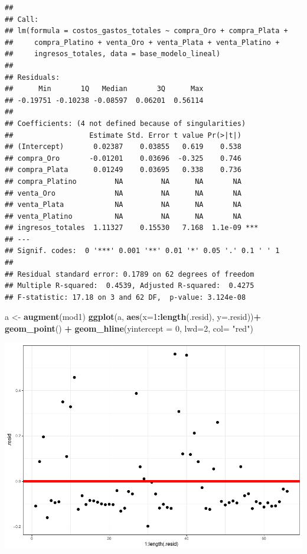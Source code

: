 \documentclass[
  11pt,
  a4paper,
]{book}
\newenvironment{Shaded}{\begin{snugshade}}{\end{snugshade}}
\newcommand{\DataTypeTok}[1]{\textcolor[rgb]{0.13,0.29,0.53}{#1}}
\newcommand{\DecValTok}[1]{\textcolor[rgb]{0.00,0.00,0.81}{#1}}
\newcommand{\KeywordTok}[1]{\textcolor[rgb]{0.13,0.29,0.53}{\textbf{#1}}}
\newcommand{\NormalTok}[1]{#1}
\newcommand{\OperatorTok}[1]{\textcolor[rgb]{0.81,0.36,0.00}{\textbf{#1}}}
\newcommand{\StringTok}[1]{\textcolor[rgb]{0.31,0.60,0.02}{#1}}
\begin{document}
\begin{verbatim}
## 
## Call:
## lm(formula = costos_gastos_totales ~ compra_Oro + compra_Plata + 
##     compra_Platino + venta_Oro + venta_Plata + venta_Platino + 
##     ingresos_totales, data = base_modelo_lineal)
## 
## Residuals:
##      Min       1Q   Median       3Q      Max 
## -0.19751 -0.10238 -0.08597  0.06201  0.56114 
## 
## Coefficients: (4 not defined because of singularities)
##                  Estimate Std. Error t value Pr(>|t|)    
## (Intercept)       0.02387    0.03855   0.619    0.538    
## compra_Oro       -0.01201    0.03696  -0.325    0.746    
## compra_Plata      0.01249    0.03695   0.338    0.736    
## compra_Platino         NA         NA      NA       NA    
## venta_Oro              NA         NA      NA       NA    
## venta_Plata            NA         NA      NA       NA    
## venta_Platino          NA         NA      NA       NA    
## ingresos_totales  1.11327    0.15530   7.168  1.1e-09 ***
## ---
## Signif. codes:  0 '***' 0.001 '**' 0.01 '*' 0.05 '.' 0.1 ' ' 1
## 
## Residual standard error: 0.1789 on 62 degrees of freedom
## Multiple R-squared:  0.4539, Adjusted R-squared:  0.4275 
## F-statistic: 17.18 on 3 and 62 DF,  p-value: 3.124e-08
\end{verbatim}

\begin{Shaded}
\begin{Highlighting}[]
\NormalTok{a <-}\StringTok{ }\KeywordTok{augment}\NormalTok{(mod1)}
\KeywordTok{ggplot}\NormalTok{(a, }\KeywordTok{aes}\NormalTok{(}\DataTypeTok{x=}\DecValTok{1}\OperatorTok{:}\KeywordTok{length}\NormalTok{(.resid), }\DataTypeTok{y=}\NormalTok{.resid))}\OperatorTok{+}
\StringTok{  }\KeywordTok{geom_point}\NormalTok{() }\OperatorTok{+}\StringTok{ }
\StringTok{  }\KeywordTok{geom_hline}\NormalTok{(}\DataTypeTok{yintercept =} \DecValTok{0}\NormalTok{, }\DataTypeTok{lwd=}\DecValTok{2}\NormalTok{, }\DataTypeTok{col=} \StringTok{"red"}\NormalTok{)}
\end{Highlighting}
\end{Shaded}

\includegraphics{index_files/figure-latex/unnamed-chunk-11-1.pdf}
\end{document}
